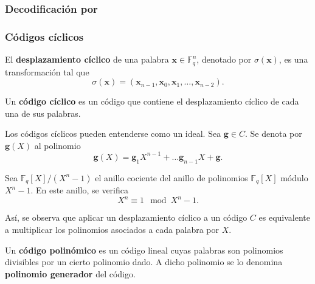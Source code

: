 \subsubsection{Decodificación por }

\subsubsection{Códigos cíclicos}

\begin{definition}
	El \textbf{desplazamiento cíclico} de una palabra $\textbf{x} \in \mathbb{F}_q^n$, denotado por $\sigma(\textbf{x})$, es una transformación tal que
	\[\sigma(\textbf{x}) = (\textbf{x}_{n-1}, \textbf{x}_0, \textbf{x}_1, \dots, \textbf{x}_{n-2}).\]
\end{definition}

\begin{definition}
	Un \textbf{código cíclico} es un código que contiene el desplazamiento cíclico de cada una de sus palabras.
\end{definition}

\begin{remark}
	Los códigos cíclicos pueden entenderse como un ideal. Sea $\textbf{g} \in C$. Se denota por $\textbf{g}(X)$ al polinomio
	\[\textbf{g}(X) = \textbf{g}_1X^{n-1} + \hdots \textbf{g}_{n-1}X + \textbf{g}.\]
	
	Sea $\mathbb{F}_q[X] / (X^n - 1)$ el anillo cociente del anillo de polinomios $\mathbb{F}_q[X]$ módulo $X^n - 1$. En este anillo, se verifica
	\[X^n \equiv 1 \mod X^n - 1.\]
	
	Así, se observa que aplicar un desplazamiento cíclico a un código $C$ es equivalente a multiplicar los polinomios asociados a cada palabra por $X$.
\end{remark}



\begin{definition}
	Un \textbf{código polinómico} es un código lineal cuyas palabras son polinomios divisibles por un cierto polinomio dado. A dicho polinomio se lo denomina \textbf{polinomio generador} del código.
\end{definition}

